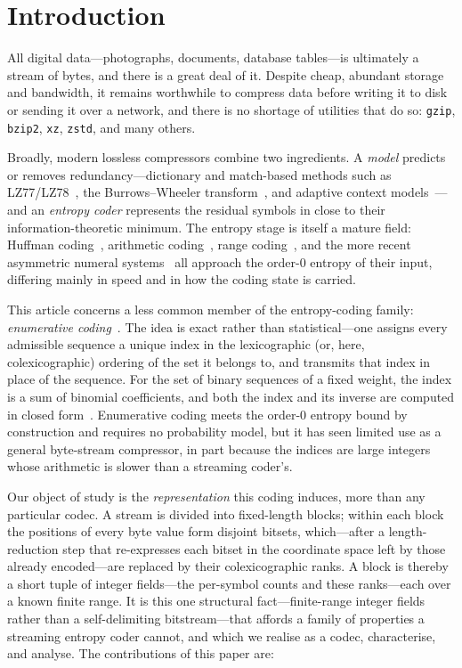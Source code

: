 \documentclass[entropy,article,submit,oneauthor,pdftex]{Definitions/mdpi}
\begin{document}
\section{Introduction}\label{sec:introduction}
All digital data---photographs, documents, database tables---is ultimately a
stream of bytes, and there is a great deal of it. Despite cheap, abundant storage
and bandwidth, it remains worthwhile to compress data before writing it to disk
or sending it over a network, and there is no shortage of utilities that do so:
\texttt{gzip}, \texttt{bzip2}, \texttt{xz}, \texttt{zstd}, and many others.

Broadly, modern lossless compressors combine two ingredients. A \emph{model}
predicts or removes redundancy---dictionary and match-based methods such as
LZ77/LZ78~\cite{ziv1977,ziv1978}, the Burrows--Wheeler transform~\cite{burrows1994},
and adaptive context models~\cite{cleary1984}---and an
\emph{entropy coder} represents the residual symbols in close to their
information-theoretic minimum. The entropy stage is itself a mature field:
Huffman coding~\cite{huffman1952}, arithmetic coding~\cite{witten1987arithmetic},
range coding~\cite{martin1979}, and
the more recent asymmetric numeral systems~\cite{duda2013ans} all approach the
order-$0$ entropy of their input, differing mainly in speed and in how the coding
state is carried.

This article concerns a less common member of the entropy-coding family:
\emph{enumerative coding}~\cite{cover1973enumerative}. The idea is exact rather
than statistical---one assigns every admissible sequence a unique index in the
lexicographic (or, here, colexicographic) ordering of the set it belongs to, and
transmits that index in place of the sequence. For the set of binary sequences of
a fixed weight, the index is a sum of binomial coefficients, and both the index
and its inverse are computed in closed form~\cite{lynch1966,schalkwijk1972}.
Enumerative coding meets the order-$0$ entropy bound by construction and requires
no probability model, but it has seen limited use as a general byte-stream
compressor, in part because the indices are large integers whose arithmetic is
slower than a streaming coder's.

Our object of study is the \emph{representation} this coding induces, more than any
particular codec. A stream is divided into fixed-length blocks; within each block the
positions of every byte value form disjoint bitsets, which---after a length-reduction step
that re-expresses each bitset in the coordinate space left by those already encoded---are
replaced by their colexicographic ranks. A block is thereby a short tuple of integer
fields---the per-symbol counts and these ranks---each over a known finite range. It is this
one structural fact---finite-range integer fields rather than a self-delimiting
bitstream---that affords a family of properties a streaming entropy coder cannot, and which
we realise as a codec, characterise, and analyse. The contributions of this paper are:
\end{document}
